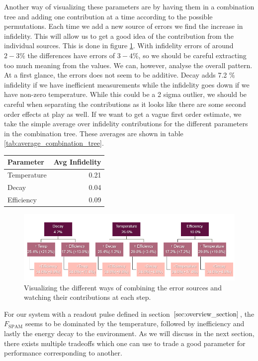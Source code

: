 Another way of visualizing these parameters are by having them in a combination tree and adding one contribution at a time according to the possible permutations. Each time we add a new source of errors we find the increase in infidelity. This will allow us to get a good idea of the contribution from the individual sources. This is done in figure \ref{fig:combination_tree_budget}. With infidelity errors of around $2-3\%$ the differences have errors of $3-4 \%$, so we should be careful extracting too much meaning from the values. We can, however, analyse the overall pattern. At a first glance, the errors does not seem to be additive. Decay adds 7.2 \% infidelity if we have inefficient measurements while the infidelity goes down if we have non-zero temperature. While this could be a 2 sigma outlier, we should be careful when separating the contributions as it looks like there are some second order effects at play as well. If we want to get a vague first order estimate, we take the simple average over infidelity contributions for the different parameters in the combination tree. These averages are shown in table \ref{tab:average_combination_tree}. 
\begin{margintable}[-4 cm]
    \centering
    \caption{Average contribution to infidelity when counting in the combination tree seen in figure \ref{fig:combination_tree_budget}}
    \vspace{0.3 cm}
    \begin{tabular}{l|r}
    \hline
    Parameter       &  Avg Infidelity\\ \hline
    Temperature     & 0.21 \\
    Decay           & 0.04 \\
    Efficiency      & 0.09 \\
    \end{tabular}
    \label{tab:average_combination_tree}
\end{margintable}
\begin{figure}
    \centering
    \includegraphics{Figs/Results/combination_tree.png}
    \caption{Visualizing the different ways of combining the error sources and watching their contributions at each step.}
    \label{fig:combination_tree_budget}
\end{figure}
For our system with a readout pulse defined in section $\ref{sec:overview_section}$, the $F_{\text{SPAM}}$ seems to be dominated by the temperature, followed by inefficiency and lastly the energy decay to the environment. As we will discuss in the next section, there exists multiple tradeoffs which one can use to trade a good parameter for performance corresponding to another.




